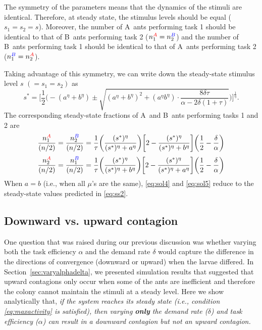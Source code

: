 \documentclass[11pt]{article}
\newcommand{\A}{{\color{red}A}}
\newcommand{\B}{{\color{blue}B}}
\begin{document}
\begin{appendices}
The symmetry of the parameters means that the dynamics of the stimuli are identical. Therefore, at steady state, the stimulus levels should be equal ($s_1 = s_2 = s$). Moreover, the number of \A\ ants performing task 1 should be identical to that of \B\ ants performing task 2 ($n_{1}^{\A} = n_{2}^{\B}$) and the number of \B\ ants performing task 1 should be identical to that of \A\ ants performing task 2 ($n_{1}^{\B} = n_{2}^{\A}$).

Taking advantage of this symmetry, we can write down the steady-state stimulus level $s$ $(=s_1 = s_2)$ as
\begin{equation}
    s^* = \bigg[\frac{1}{2} \bigg( -({a}^\eta + {b}^\eta) 
    \pm \sqrt{
    ({a}^\eta + {b}^\eta)^2 + ({a}^\eta {b}^\eta)\cdot \frac{8\delta \tau}{\alpha - 2\delta (1+\tau)}
    } \bigg)\bigg]^\frac{1}{\eta}.
\end{equation}
The corresponding steady-state fractions of \A\ and \B\ ants performing tasks 1 and 2 are
\begin{equation}
    \frac{n_1^{\A}}{(n/2)} =  \frac{n_2^{\B}}{(n/2)} = \frac{1}{\tau} \bigg(\frac{(s^*)^\eta}{(s^*)^\eta + {a}^\eta} \bigg)\bigg[2 - \frac{(s^*)^\eta}{(s^*)^\eta + {b}^\eta}  \bigg] \bigg(\frac{1}{2} - \frac{\delta}{\alpha} \bigg)
    \label{eq:sol4}
\end{equation}
\begin{equation}
    \frac{n_2^{\A}}{(n/2)} =  \frac{n_1^{\B}}{(n/2)}  = \frac{1}{\tau} \bigg(\frac{(s^*)^\eta}{(s^*)^\eta + {b}^\eta} \bigg)\bigg[2 - \frac{(s^*)^\eta}{(s^*)^\eta + {a}^\eta}  \bigg] \bigg(\frac{1}{2} - \frac{\delta}{\alpha} \bigg)
    \label{eq:sol5}
\end{equation}
When $a = b$ (i.e., when all $\mu$'s are the same), \eqref{eq:sol4} and \eqref{eq:sol5} reduce to the steady-state values predicted in \eqref{eq:ss2}.

\subsection{Downward vs. upward contagion} \label{sec:updown}

One question that was raised during our previous discussion was whether varying both the task efficiency $\alpha$ and the demand rate $\delta$ would capture the difference in the directions of convergence (downward or upward) when the larvae differed. In Section~\ref{sec:varyalphadelta}, we presented simulation results that suggested that upward contagions only occur when some of the ants are inefficient and therefore the colony cannot maintain the stimuli at a steady level. Here we show analytically that, \textit{if the system reaches its steady state (i.e., condition \eqref{eq:maxactivity} is satisfied), then varying \textbf{only} the demand rate ($\delta$) and task efficiency ($\alpha$) can result in a downward contagion but not an upward contagion.}


\end{appendices}
\end{document}
